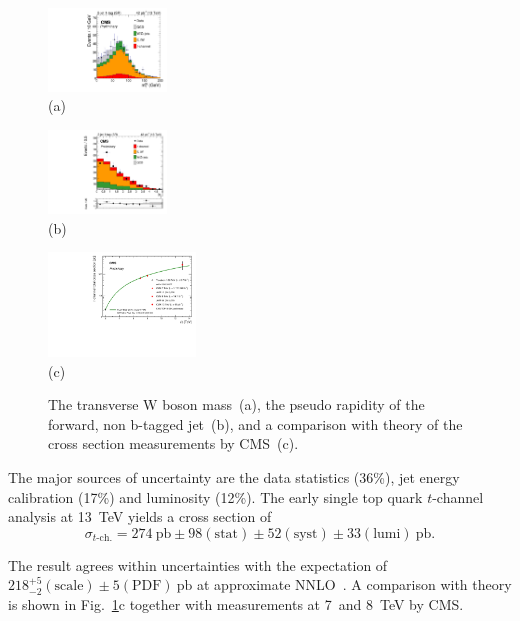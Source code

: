 \documentclass{PoS}
\begin{document}
\begin{figure}[htbp]
\begin{center}
\parbox[t]{0.29\textwidth}{\centering\includegraphics[width=0.28\textwidth]{cms_xsec13/mtw.pdf}\\(a)}
\parbox[t]{0.29\textwidth}{\centering\includegraphics[width=0.28\textwidth]{cms_xsec13/mu2j1t.pdf}\\(b)}
\parbox[t]{0.39\textwidth}{\centering\includegraphics[width=0.35\textwidth]{cms_xsec13/xsec.pdf}\\(c)}
\end{center}
\caption{\label{fig:singletop13}The transverse W boson mass~(a), the pseudo rapidity of the forward, non b-tagged jet~(b), and a comparison with theory of the cross section measurements by CMS~(c).}
\end{figure}

The major sources of uncertainty are the data statistics (36\%), jet energy calibration (17\%) and luminosity (12\%).
The early single top quark $t$-channel analysis at 13~TeV yields a cross section of
\begin{equation}
\sigma_{t\mbox{-}\mathrm{ch.}}=274~\mathrm{pb}\pm98\mathrm{(stat)}\pm52\mathrm{(syst)}\pm33\mathrm{(lumi)}~\mathrm{pb}.
\end{equation}

The result agrees within uncertainties with the expectation of $218_{-2}^{+5}\mathrm{(scale)}\pm5\mathrm{(PDF)}~\mathrm{pb}$ at approximate NNLO~\cite{Kidonakis-8tev}. A comparison with theory is shown in Fig.~\ref{fig:singletop13}c together with measurements at 7~and 8~TeV by CMS.
\end{document}
